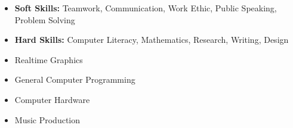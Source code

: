 
\begin{itemize}
    \item \textbf{Soft Skills:} Teamwork, Communication, Work Ethic, Public Speaking, Problem Solving
    \item \textbf{Hard Skills:} Computer Literacy, Mathematics, Research, Writing, Design
\end{itemize}


\begin{itemize}
    \item Realtime Graphics
    \item General Computer Programming
    \item Computer Hardware
    \item Music Production
\end{itemize}




\bigskip
{}
